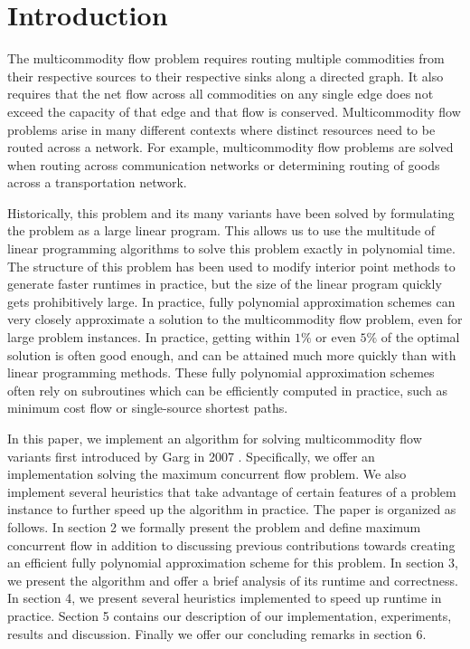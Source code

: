 \section{Introduction}

The multicommodity flow problem requires routing multiple commodities
from their respective sources to their respective sinks along a
directed graph. It also requires that the net flow across all commodities on any
single edge does not exceed the capacity of that edge and that flow is conserved. Multicommodity
flow problems arise in many different contexts where distinct
resources need to be routed across a network. For example,
multicommodity flow problems are solved when routing across
communication networks or determining routing of goods across a transportation network.

Historically, this problem and its many variants have been solved by
formulating the problem as a large linear program. This allows us to
use the multitude of linear programming
algorithms to solve this problem exactly in polynomial time. The
structure of this problem has been used to modify
interior point methods to generate faster runtimes in practice, but
the size of the linear program quickly gets prohibitively large. In
practice, fully polynomial approximation schemes can very closely
approximate a solution to the multicommodity flow problem, even for
large problem instances. In practice, getting within $1\%$ or even
$5\%$ of the optimal solution is often good enough, and can be
attained much more quickly than with linear
programming methods. These fully polynomial approximation schemes
often rely on subroutines which can be efficiently computed in
practice, such as minimum cost flow or single-source shortest paths.

In this paper, we implement an algorithm for solving multicommodity
flow variants first introduced by Garg in 2007 \cite{garg}. 
Specifically, we offer
an implementation solving the maximum concurrent flow problem. We also
implement several heuristics that take advantage of certain features
of a problem instance to further speed up the algorithm in
practice. The paper is organized as follows. In section 2
we formally present the problem and define maximum concurrent flow in
addition to discussing previous contributions towards creating an
efficient fully polynomial approximation scheme for this problem. In
section 3, we present the algorithm and offer a brief analysis of its
runtime and correctness. In section 4, we present several heuristics
implemented to speed up runtime in practice. Section 5 contains our
description of our implementation, experiments, results and
discussion.  Finally we offer our concluding remarks in section 6.

